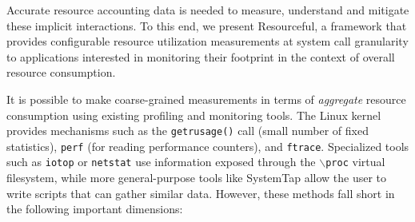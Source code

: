 \documentclass[letterpaper,twocolumn,10pt]{article}
\newcommand{\pname}{Resourceful}
\newcommand{\lnote}[1]{\textcolor{red}{[\textit{#1}]}} %
\begin{document}


Accurate resource accounting data is needed to measure, understand and mitigate
these implicit interactions. To this end, we present \pname, a framework
that provides configurable resource utilization measurements at system call
granularity to applications interested in monitoring their footprint in the
context of overall resource consumption.


It is possible to make coarse-grained measurements in terms of
\textit{aggregate} resource consumption using existing profiling and monitoring
tools. The Linux kernel provides mechanisms such as the \texttt{getrusage()} call
(small number of fixed statistics), \texttt{perf} (for reading performance
counters), and \texttt{ftrace}. Specialized tools such as \texttt{iotop} or
\texttt{netstat} use information exposed through the \texttt{$\backslash$proc}
virtual filesystem, while more general-purpose tools like SystemTap allow the
user to write scripts that can gather similar data. However, these methods fall
short in the following important dimensions:
\end{document}
